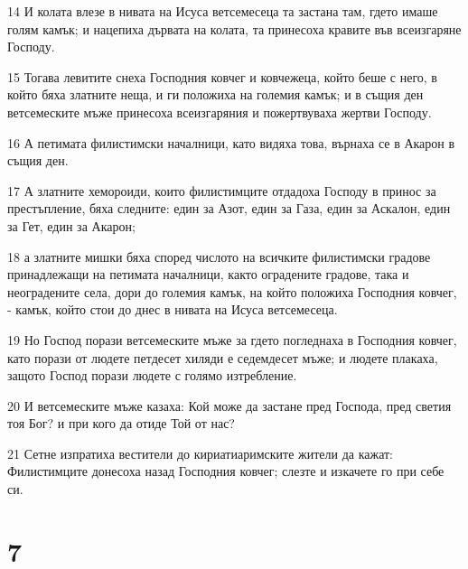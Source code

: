 \par 14 И колата влезе в нивата на Исуса ветсемесеца та застана там, гдето имаше голям камък; и нацепиха дървата на колата, та принесоха кравите във всеизгаряне Господу.
\par 15 Тогава левитите снеха Господния ковчег и ковчежеца, който беше с него, в който бяха златните неща, и ги положиха на големия камък; и в същия ден ветсемеските мъже принесоха всеизгаряния и пожертвуваха жертви Господу.
\par 16 А петимата филистимски началници, като видяха това, върнаха се в Акарон в същия ден.
\par 17 А златните хемороиди, които филистимците отдадоха Господу в принос за престъпление, бяха следните: един за Азот, един за Газа, един за Аскалон, един за Гет, един за Акарон;
\par 18 а златните мишки бяха според числото на всичките филистимски градове принадлежащи на петимата началници, както оградените градове, така и неоградените села, дори до големия камък, на който положиха Господния ковчег, - камък, който стои до днес в нивата на Исуса ветсемесеца.
\par 19 Но Господ порази ветсемеските мъже за гдето погледнаха в Господния ковчег, като порази от людете петдесет хиляди е седемдесет мъже; и людете плакаха, защото Господ порази людете с голямо изтребление.
\par 20 И ветсемеските мъже казаха: Кой може да застане пред Господа, пред светия тоя Бог? и при кого да отиде Той от нас?
\par 21 Сетне изпратиха вестители до кириатиаримските жители да кажат: Филистимците донесоха назад Господния ковчег; слезте и изкачете го при себе си.

\chapter{7}

